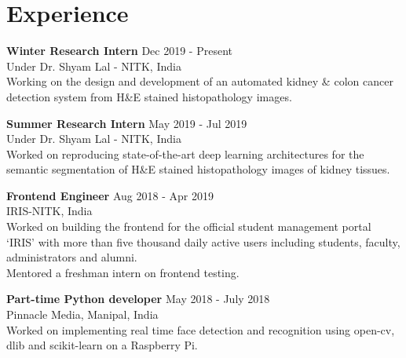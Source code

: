 \documentclass[letterpaper]{article}
\renewenvironment{itemize}{
  \begin{list}{}{
    \setlength{\leftmargin}{1.5em}
  }
}{
  \end{list}
}
\newcommand{\smallGreyFont}[1]{\textcolor{black!80}{\small{#1}}}
\begin{document}
\section*{Experience}
  \begin{itemize}
    \item \textbf{Winter Research Intern}
    \hfill{\textcolor{black!80}{\small{Dec 2019 - Present}}}\\
    \smallGreyFont{Under Dr. Shyam Lal - NITK, India}\\
      Working on the design and development of an automated kidney \& colon cancer detection system from H\&E stained histopathology images.

    \item \textbf{Summer Research Intern}
    \hfill{\textcolor{black!80}{\small{May 2019 - Jul 2019}}}\\
    \smallGreyFont{Under Dr. Shyam Lal - NITK, India}\\
      Worked on reproducing state-of-the-art deep learning architectures for the semantic segmentation of H\&E stained histopathology images of kidney tissues.

    \item \textbf{Frontend Engineer}
    \hfill{\textcolor{black!80}{\small{Aug 2018 - Apr 2019}}}\\
    \smallGreyFont{IRIS-NITK, India}\\
      Worked on building the frontend for the official student management portal `IRIS' with more than five thousand daily active users including students, faculty, administrators and alumni.\\
      Mentored a freshman intern on frontend testing.

    \item \textbf{Part-time Python developer}
    \hfill{\textcolor{black!80}{\small{May 2018 - July 2018}}}\\
    \smallGreyFont{Pinnacle Media, Manipal, India}\\
      Worked on implementing real time face detection and recognition using open-cv, dlib and scikit-learn on a Raspberry Pi.
  \end{itemize}


\end{document}
